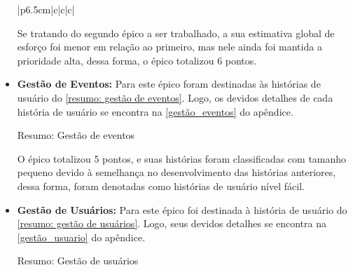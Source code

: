 \begin{itemize}
\begin{quadro}[htb]
{\begin{tabular}{|p{6.5cm}|c|c|c|}
\end{tabular}}
\end{quadro}
\FloatBarrier 

Se tratando do segundo épico a ser trabalhado, a sua estimativa global de esforço foi menor em relação ao primeiro, mas nele ainda foi mantida a prioridade alta, dessa forma, o épico totalizou 6 pontos.
    
\item {\textbf{Gestão de Eventos:}} Para este épico foram destinadas às histórias de usuário do \autoref{resumo: gestão de eventos}. Logo, os devidos detalhes de cada história de usuário se encontra na \autoref{gestão_eventos} do apêndice.

\def\arraystretch{2}
\begin{quadro}[htb]
\centering
\ABNTEXfontereduzida
\caption{Resumo: Gestão de eventos}
\label{resumo: gestão de eventos}
\end{quadro}
\FloatBarrier 

O épico totalizou 5 pontos, e suas histórias foram classificadas com tamanho pequeno devido à semelhança no desenvolvimento das histórias anteriores, dessa forma, foram denotadas como histórias de usuário nível fácil.

\item {\textbf{Gestão de Usuários:}} Para este épico foi destinada à história de usuário do \autoref{resumo: gestão de usuários}. Logo, seus devidos detalhes se encontra na \autoref{gestão_usuario} do apêndice.

\def\arraystretch{2}
\begin{quadro}[htb]
\centering
\ABNTEXfontereduzida
\caption{Resumo: Gestão de usuários}
\label{resumo: gestão de usuários}
\end{quadro}
\end{itemize}
